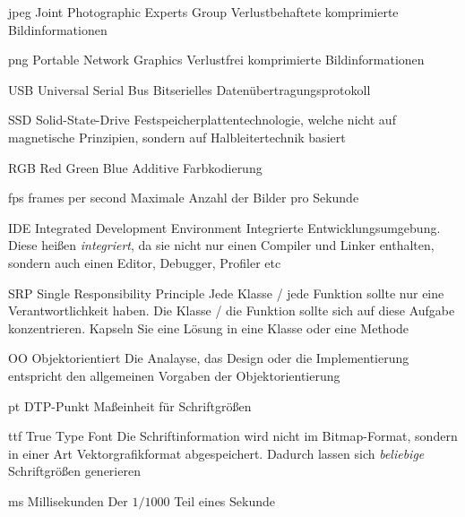   {jpeg}            %
  {Joint Photographic Experts Group}  %
  {Verlustbehaftete komprimierte Bildinformationen} %

  {png}            %
  {Portable Network Graphics}  %
  {Verlustfrei komprimierte Bildinformationen} %

  {USB}            %
  {Universal Serial Bus}  %
  {Bitserielles Datenübertragungsprotokoll} %

  {SSD}            %
  {Solid-State-Drive}  %
  {Festspeicherplattentechnologie, welche nicht auf magnetische Prinzipien, sondern auf Halbleitertechnik basiert} %

  {RGB}            %
  {Red Green Blue}  %
  {Additive Farbkodierung} %

  {fps}            %
  {frames per second}  %
  {Maximale Anzahl der Bilder pro Sekunde} %

  {IDE}            %
  {Integrated Development Environment}  %
  {Integrierte Entwicklungsumgebung. Diese heißen \emph{integriert}, da sie nicht nur einen Compiler und Linker enthalten, sondern auch einen Editor, Debugger, Profiler etc} %

  {SRP}            %
  {Single Responsibility Principle}  %
  {Jede Klasse / jede Funktion sollte nur eine Verantwortlichkeit haben. Die Klasse / die Funktion sollte sich
  auf diese Aufgabe konzentrieren. Kapseln Sie eine Lösung in eine Klasse oder eine Methode} %

  {OO}            %
  {Objektorientiert}  %
  {Die Analayse, das Design oder die Implementierung entspricht den allgemeinen Vorgaben der Objektorientierung} %

  {pt}            %
  {DTP-Punkt}  %
  {Maßeinheit für Schriftgrößen} %

  {ttf}            %
  {True Type Font}  %
  {Die Schriftinformation wird nicht im Bitmap-Format, sondern in einer Art Vektorgrafikformat abgespeichert. Dadurch lassen sich \emph{beliebige} Schriftgrößen generieren} %

  {ms}            %
  {Millisekunden}  %
  {Der $1/1000$ Teil eines Sekunde} %

